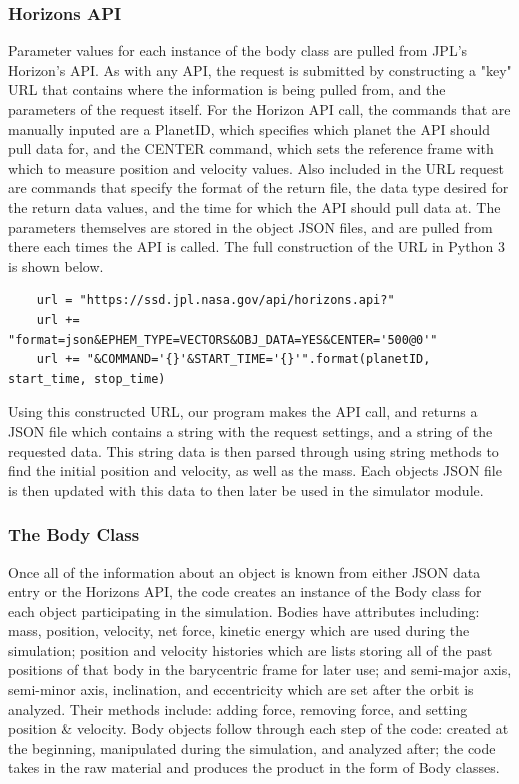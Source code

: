 \documentclass[a4paper,12pt]{article} %
\numberwithin{equation}{section} %
\numberwithin{figure}{section} %
\begin{document}
\subsubsection{Horizons API \cite{Horizons}}
\label{sec:API}

Parameter values for each instance of the body class are pulled from JPL's Horizon's API. As with any API, the request is submitted by constructing a "key" URL that contains where the information is being pulled from, and the parameters of the request itself. For the Horizon API call, the commands that are manually inputed are a PlanetID, which specifies which planet the API should pull data for, and the CENTER command, which sets the reference frame with which to measure position and velocity values. Also included in the URL request are commands that specify the format of the return file, the data type desired for the return data values, and the time for which the API should pull data at. The parameters themselves are stored in the object JSON files, and are pulled from there each times the API is called. The full construction of the URL in Python 3 is shown below.

\begin{verbatim}
    url = "https://ssd.jpl.nasa.gov/api/horizons.api?"
    url += "format=json&EPHEM_TYPE=VECTORS&OBJ_DATA=YES&CENTER='500@0'"
    url += "&COMMAND='{}'&START_TIME='{}'".format(planetID, start_time, stop_time)
\end{verbatim}

Using this constructed URL, our program makes the API call, and returns a JSON file which contains a string with the request settings, and a string of the requested data. This string data is then parsed through using string methods to find the initial position and velocity, as well as the mass. Each objects JSON file is then updated with this data to then later be used in the simulator module.

\subsubsection{The Body Class}
Once all of the information about an object is known from either JSON data entry or the Horizons API, the code creates an instance of the Body class for each object participating in the simulation. Bodies have attributes including: mass, position, velocity, net force, kinetic energy which are used during the simulation; position and velocity histories which are lists storing all of the past positions of that body in the barycentric frame for later use; and semi-major axis, semi-minor axis, inclination, and eccentricity which are set after the orbit is analyzed. Their methods include: adding force, removing force, and setting position \& velocity. Body objects follow through each step of the code: created at the beginning, manipulated during the simulation, and analyzed after; the code takes in the raw material and produces the product in the form of Body classes.
\end{document}
